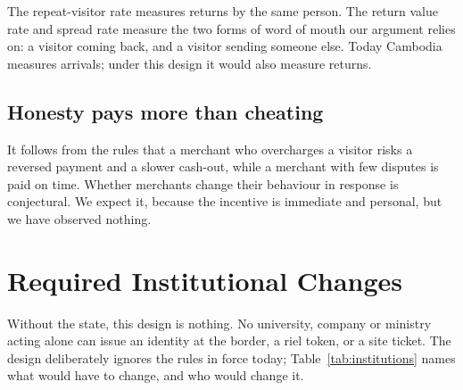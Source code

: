 \documentclass[10pt,letterpaper,twocolumn]{article}
\begin{document}
The repeat-visitor rate measures returns by the same person. The return value
rate and spread rate measure the two forms of word of mouth our argument relies
on: a visitor coming back, and a visitor sending someone else. Today Cambodia
measures arrivals; under this design it would also measure returns.

\subsection{Honesty pays more than cheating}

It follows from the rules that a merchant who overcharges a visitor risks a
reversed payment and a slower cash-out, while a merchant with few disputes is
paid on time. Whether merchants change their behaviour in response is
conjectural. We expect it, because the incentive is immediate and personal, but
we have observed nothing.

\section{Required Institutional Changes}
\label{sec:institutions}

Without the state, this design is nothing. No university, company or ministry
acting alone can issue an identity at the border, a riel token, or a site
ticket. The design deliberately ignores the rules in force today;
Table~\ref{tab:institutions} names what would have to change, and who would
change it.
\end{document}
